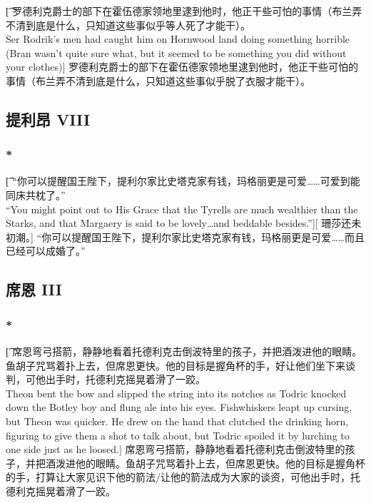 \documentclass[12pt,a4paper]{article}
\begin{document}
\subsubsection{}\t[
	罗德利克爵士的部下在霍伍德家领地里逮到他时，他正干些可怕的事情（布兰弄不清到底是什么，只知道这些事似乎等人死了才能干）。\\
	Ser Rodrik's men had caught him on Hornwood land doing something horrible (Bran wasn't quite sure what, but it seemed to be something you did without your clothes)]
	罗德利克爵士的部下在霍伍德家领地里逮到他时，他正干些可怕的事情（布兰弄不清到底是什么，只知道这些事似乎脱了衣服才能干）。
	
\subsection{提利昂 VIII}
\subsubsection{\color{red}*}\t[	
	 “你可以提醒国王陛下，提利尔家比史塔克家有钱，玛格丽更是可爱……可爱到能同床共枕了。”\\
	 “You might point out to His Grace that the Tyrells are much wealthier than the Starks, and that Margaery is said to be lovely\ldots and beddable besides.”][
	 珊莎还未初潮。]
	 “你可以提醒国王陛下，提利尔家比史塔克家有钱，玛格丽更是可爱……而且已经可以成婚了。”
	 
\subsection{席恩 III}
\subsubsection{\color{red}*}\t[	
	席恩弯弓搭箭，静静地看着托德利克击倒波特里的孩子，并把酒泼进他的眼睛。鱼胡子咒骂着扑上去，但席恩更快。他的目标是握角杯的手，好让他们坐下来谈判，可他出手时，托德利克摇晃着滑了一跤。\\
	Theon bent the bow and slipped the string into its notches as Todric knocked down the Botley boy and flung ale into his eyes. Fishwhiskers leapt up cursing, but Theon was quicker. He drew on the hand that clutched the drinking horn, figuring to give them a shot to talk about, but Todric spoiled it by lurching to one side just as he loosed.]
	席恩弯弓搭箭，静静地看着托德利克击倒波特里的孩子，并把酒泼进他的眼睛。鱼胡子咒骂着扑上去，但席恩更快。他的目标是握角杯的手，打算让大家见识下他的箭法/让他的箭法成为大家的谈资，可他出手时，托德利克摇晃着滑了一跤。
\end{document}
